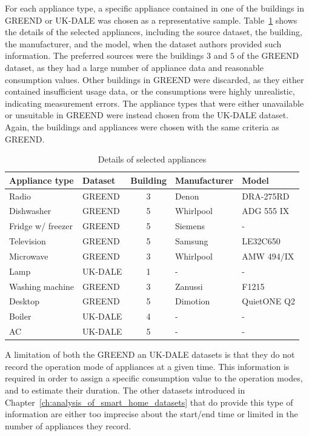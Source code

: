 For each appliance type, a specific appliance contained in one of the buildings in GREEND or UK-DALE was chosen as a representative sample. Table~\ref{tab:appliances_details} shows the details of the selected appliances, including the source dataset, the building, the manufacturer, and the model, when the dataset authors provided such information. The preferred sources were the buildings $3$ and $5$ of the GREEND dataset, as they had a large number of appliance data and reasonable consumption values. Other buildings in GREEND were discarded, as they either contained insufficient usage data, or the consumptions were highly unrealistic, indicating measurement errors. The appliance types that were either unavailable or unsuitable in GREEND were instead chosen from the UK-DALE dataset. Again, the buildings and appliances were chosen with the same criteria as GREEND.

\begin{table}
\centering
\begin{tabular}{llcll}
\hline
\textbf{Appliance type} & \textbf{Dataset} & \textbf{Building} & \textbf{Manufacturer} & \textbf{Model} \\ \hline
Radio             & GREEND  & 3 & Denon       & DRA-275RD   \\
Dishwasher        & GREEND  & 5 & Whirlpool   & ADG 555 IX  \\
Fridge w/ freezer & GREEND  & 5 & Siemens     & -           \\
Television        & GREEND  & 5 & Samsung     & LE32C650    \\
Microwave         & GREEND  & 3 & Whirlpool   & AMW 494/IX  \\
Lamp              & UK-DALE & 1 & -           & -           \\
Washing machine   & GREEND  & 3 & Zanussi     & F1215       \\
Desktop           & GREEND  & 5 & Dimotion    & QuietONE Q2 \\
Boiler            & UK-DALE & 4 & -           & -           \\
AC                & UK-DALE & 5 & -           & -           \\ \hline
\end{tabular}%
\caption{Details of selected appliances}
\label{tab:appliances_details}
\end{table}

A limitation of both the GREEND an UK-DALE datasets is that they do not record the operation mode of appliances at a given time. This information is required in order to assign a specific consumption value to the operation modes, and to estimate their duration. The other datasets introduced in Chapter~\ref{ch:analysis_of_smart_home_datasets} that do provide this type of information are either too imprecise about the start/end time or limited in the number of appliances they record.

